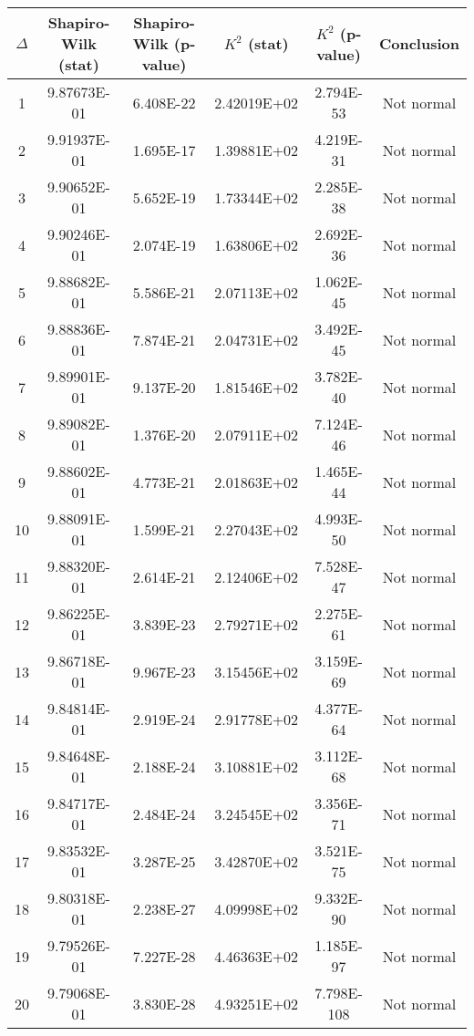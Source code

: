 \begin{table}[h]
	\begin{tabular}{|c|c|c|c|c|c|}
		\hline
		$\Delta$ &  Shapiro-Wilk (stat) & Shapiro-Wilk (p-value) & $K^2$ (stat) & $K^2$ (p-value) & Conclusion\\\hline
		\hline
		1 & 9.87673E-01 & 6.408E-22 & 2.42019E+02 & 2.794E-53 & Not normal\\\hline
		2 & 9.91937E-01 & 1.695E-17 & 1.39881E+02 & 4.219E-31 & Not normal\\\hline
		3 & 9.90652E-01 & 5.652E-19 & 1.73344E+02 & 2.285E-38 & Not normal\\\hline
		4 & 9.90246E-01 & 2.074E-19 & 1.63806E+02 & 2.692E-36 & Not normal\\\hline
		5 & 9.88682E-01 & 5.586E-21 & 2.07113E+02 & 1.062E-45 & Not normal\\\hline
		6 & 9.88836E-01 & 7.874E-21 & 2.04731E+02 & 3.492E-45 & Not normal\\\hline
		7 & 9.89901E-01 & 9.137E-20 & 1.81546E+02 & 3.782E-40 & Not normal\\\hline
		8 & 9.89082E-01 & 1.376E-20 & 2.07911E+02 & 7.124E-46 & Not normal\\\hline
		9 & 9.88602E-01 & 4.773E-21 & 2.01863E+02 & 1.465E-44 & Not normal\\\hline
		10 & 9.88091E-01 & 1.599E-21 & 2.27043E+02 & 4.993E-50 & Not normal\\\hline
		11 & 9.88320E-01 & 2.614E-21 & 2.12406E+02 & 7.528E-47 & Not normal\\\hline
		12 & 9.86225E-01 & 3.839E-23 & 2.79271E+02 & 2.275E-61 & Not normal\\\hline
		13 & 9.86718E-01 & 9.967E-23 & 3.15456E+02 & 3.159E-69 & Not normal\\\hline
		14 & 9.84814E-01 & 2.919E-24 & 2.91778E+02 & 4.377E-64 & Not normal\\\hline
		15 & 9.84648E-01 & 2.188E-24 & 3.10881E+02 & 3.112E-68 & Not normal\\\hline
		16 & 9.84717E-01 & 2.484E-24 & 3.24545E+02 & 3.356E-71 & Not normal\\\hline
		17 & 9.83532E-01 & 3.287E-25 & 3.42870E+02 & 3.521E-75 & Not normal\\\hline
		18 & 9.80318E-01 & 2.238E-27 & 4.09998E+02 & 9.332E-90 & Not normal\\\hline
		19 & 9.79526E-01 & 7.227E-28 & 4.46363E+02 & 1.185E-97 & Not normal\\\hline
		20 & 9.79068E-01 & 3.830E-28 & 4.93251E+02 & 7.798E-108 & Not normal\\\hline

\end{tabular}
\end{table}
